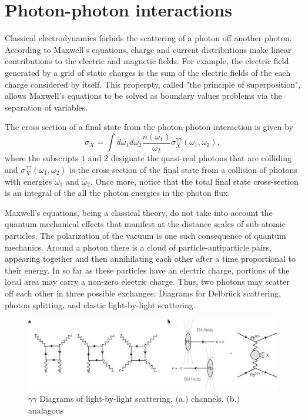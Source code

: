 \section{Photon-photon interactions}

Classical electrodynamics forbids the scattering of a photon off another photon. According to Maxwell's equations, charge and current distributions make linear contributions to the electric and magnetic fields. For example, the electric field generated by a grid of static charges is the sum of the electric fields of the each charge considered by itself. This properpty, called "the principle of superposition", allows Maxwell's equations to be solved as boundary values problems via the separation of variables.

The cross section of a final state from the photon-photon interaction is given by
\begin{equation}
\sigma_X = \int d \omega_1 d \omega_2 \frac{n(\omega_1)}{\omega_2} \sigma_X^{\gamma\gamma}(\omega_1, \omega_2),
\end{equation}
where the subscripts $1$ and $2$ designate the quasi-real photons that are colliding and 
$\sigma_X^{\gamma\gamma}(\omega_1, \omega_2)$ is the cross-section of the final state from a collision of photons with energies $\omega_1$ and $\omega_2$. Once more, notice that the total final state cross-section is an integral of the all the photon energies in the photon flux. 

Maxwell's equations, being a classical theory, do not take into account the quantum mechanical effects that manifest at the distance scales of sub-atomic particles. The polarization of the vacuum is one such consequence of quantum mechanics. Around a photon there is a cloud of particle-antiparticle pairs, appearing together and then annihilating each other after a time proportional to their energy. In so far as these particles have an electric charge, portions of the local area may carry a non-zero electric charge. Thus, two photons may scatter off each other in three possible exchanges: Diagrams for Delbrück scattering, photon splitting, and elastic light-by-light scattering. 
\begin{figure}[h!]
\begin{centering}
\includegraphics[width=7in]{Chapter2/importfigs/nphys4208-f1.jpg}
\par\end{centering}
\caption{$\gamma \gamma$ Diagrams of light-by-light scattering, (a.) channels, (b.) analagous \cite{Aaboud:2017bwk} \label{fig:ggDiag}}
\end{figure}

